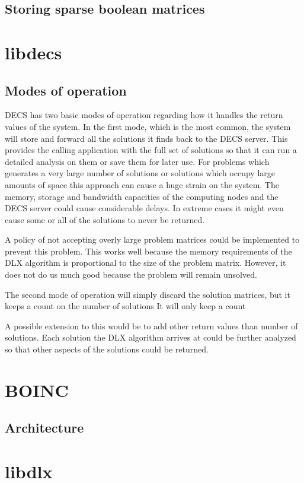 \subsection{Storing sparse boolean matrices}


\section{libdecs}


\subsection{Modes of operation}

DECS has two basic modes of operation regarding how it handles the return values of the system.
In the first mode, which is the most common, the system will store and forward all the solutions it finds back to the DECS server.
This provides the calling application with the full set of solutions so that it can run a detailed analysis on them or save them for later use.
For problems which generates a very large number of solutions or solutions which occupy large amounts of space this approach can cause a huge strain on the system.
The memory, storage and bandwidth capacities of the computing nodes and the DECS server could cause considerable delays.
In extreme cases it might even cause some or all of the solutions to never be returned.

A policy of not accepting overly large problem matrices could be implemented to prevent this problem.
This works well because the memory requirements of the DLX algorithm is proportional to the size of the problem matrix.
However, it does not do us much good because the problem will remain unsolved.

The second mode of operation will simply discard the solution matrices, but it keeps a count on the number of solutions
It will only keep a count

A possible extension to this would be to add other return values than number of solutions.
Each solution the DLX algorithm arrives at could be further analyzed so that other aspects of the solutions could be returned.



\section{BOINC}

\subsection{Architecture}


\section{libdlx}


